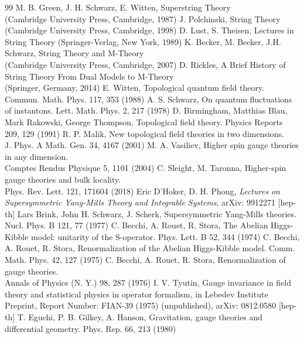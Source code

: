 \documentclass[12pt]{article}
\begin{document}
{\begin{thebibliography}{99}
   M. B. Green, J. H. Schwarz, E. Witten, Superstring Theory \\(Cambridge University Press, Cambridge, 1987) 
   J. Polchinski, String Theory (Cambridge University Press, Cambridge, 1998)    
   D. Lust, S. Theisen, Lectures in String Theory (Springer-Verlag, New York, 1989)    
   K. Becker, M. Becker, J.H. Schwarz, String Theory and M-Theory \\(Cambridge University Press, Cambridge, 2007)   
   D. Rickles, A Brief History of String Theory From Dual Models to M-Theory \\(Springer, Germany, 2014)
   E. Witten, Topological quantum field theory. Commun. Math. Phys. 117, 353 (1988)    
   A. S. Schwarz, On quantum fluctuations of instantons. Lett. Math. Phys. 2, 217 (1978)
   D. Birmingham, Matthias Blau, Mark Rakowski, George Thompson, Topological field theory. Physics Reports 209, 129 (1991)
   R. P. Malik, New topological field theories in two dimensions. \\J. Phys. A Math. Gen. 34, 4167 (2001)
 M. A. Vasiliev, Higher spin gauge theories in any dimension. \\Comptes Rendus Physique 5, 1101 (2004)
 C. Sleight, M. Taronna, Higher-spin gauge theories and bulk locality.\\ Phys. Rev. Lett. 121, 171604 (2018)
 Eric D'Hoker, D. H. Phong, {\it Lectures on Supersymmetric Yang-Mills Theory and Integrable Systems}, arXiv: 9912271 [hep-th]
 Lars Brink, John H. Schwarz, J. Scherk, Supersymmetric Yang-Mills theories. \\Nucl. Phys. B 121, 77 (1977)
 C. Becchi, A. Rouet, R. Stora, The Abelian Higgs-Kibble model: unitarity of the S-operator. Phys. Lett. B 52, 344 (1974)
  C. Becchi, A. Rouet, R. Stora, Renormalization of the Abelian Higgs-Kibble model. Comm. Math. Phys. 42, 127 (1975)
  C. Becchi, A. Rouet, R. Stora, Renormalization of gauge theories. \\ Annals of  Physics
 (N. Y.) 98, 287 (1976)
  I. V. Tyutin, Gauge invariance in field theory and statistical physics in operator formalism, in Lebedev Institute Preprint, 
                 Report Number: FIAN-39 (1975) (unpublished), arXiv: 0812.0580 [hep-th]
 T. Eguchi, P. B. Gilkey, A. Hanson, Gravitation, gauge theories and differential geometry. Phys. Rep. 66, 213 (1980)

\end{thebibliography}}
\end{document}
